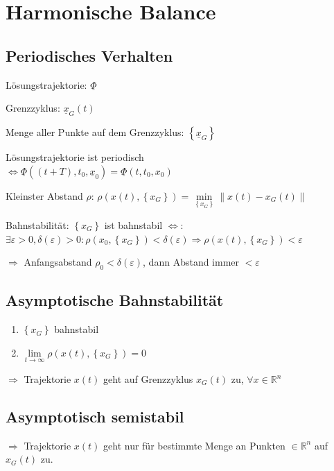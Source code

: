 \documentclass[german]{latex4ei/latex4ei_sheet}
\begin{document}
\section{Harmonische Balance}
\begin{sectionbox}
\subsection{Periodisches Verhalten}

Lösungstrajektorie: $\underline{\Phi}$

Grenzzyklus: $\underline{x}_G(t)$

Menge aller Punkte auf dem Grenzzyklus: $\left\{ \underline{x}_G \right\}$

Lösungstrajektorie ist periodisch\\ $ \Leftrightarrow \underline{\Phi}\left( (t+T), t_0, \underline{x}_0 \right) = \underline{\Phi}\left( t,t_0,x_0 \right)$

Kleinster Abstand $\rho$: $\rho\left( x(t), \left\{ x_G \right\} \right) = \min\limits_{ \left\{ x_G \right\} } \|x(t) - x_G(t)\| $

Bahnstabilität: $\left\{ x_G \right\}$ ist bahnstabil $\Leftrightarrow$:
$\exists \varepsilon > 0, \delta(\varepsilon) > 0: \rho(x_0, \left\{ x_G \right\}) < \delta(\varepsilon) \Rightarrow \rho(x(t), \left\{ x_G \right\}) < \varepsilon$

$\Rightarrow$ Anfangsabstand $\rho_0 < \delta(\varepsilon)$, dann Abstand immer $< \varepsilon$

\subsection{Asymptotische Bahnstabilität}

\begin{enumerate}
  \item $\left\{ x_G \right\}$ bahnstabil
  \item $\lim\limits_{t \rightarrow \infty} \rho\left( x(t), \left\{ x_G \right\} \right) = 0 $
\end{enumerate}
$\Rightarrow$ Trajektorie $x(t)$ geht auf Grenzzyklus $x_G(t)$ zu, $\forall x \in \mathbb{R}^n$

\subsection{Asymptotisch semistabil}
$\Rightarrow$ Trajektorie $x(t)$ geht nur für bestimmte Menge an Punkten $\in \mathbb{R}^n$ auf $x_G(t)$ zu.
\end{sectionbox}
\end{document}
